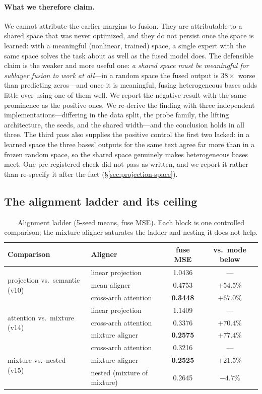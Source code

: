 \documentclass[10pt]{article}
\theoremstyle{definition}
\theoremstyle{plain}
\theoremstyle{remark}
\begin{document}
\paragraph{What we therefore claim.}
We cannot attribute the earlier margins to fusion. They are attributable to a shared space that
was never optimized, and they do not persist once the space is learned: with a meaningful
(nonlinear, trained) space, a single expert with the same space solves the task about as well as
the fused model does. The defensible claim is the weaker and more useful one: \emph{a shared space
must be meaningful for sublayer fusion to work at all}---in a random space the fused output is
$38\times$ worse than predicting zeros---and once it is meaningful, fusing heterogeneous bases
adds little over using one of them well. We report the negative result with the same prominence
as the positive ones. We re-derive the finding with three independent implementations---differing in the data split, the probe family, the lifting architecture, the seeds, and the shared width---and the conclusion holds in all three. The third pass also supplies the positive control the first two lacked: in a learned space the three bases' outputs for the same text agree far more than in a frozen random space, so the shared space genuinely makes heterogeneous bases meet. One pre-registered check did not pass as written, and we report it rather than re-specify it after the fact (\S\ref{sec:projection-space}).

\subsection{The alignment ladder and its ceiling}
\label{sec:align-exp}

\begin{table}[htbp]
\centering
\caption{Alignment ladder (5-seed means, fuse MSE). Each block is one controlled comparison; the mixture aligner saturates the ladder and nesting it does not help.}
\label{tab:ladder}
\begin{tabular}{llcc}
\toprule
\textbf{Comparison} & \textbf{Aligner} & \textbf{fuse MSE} & \textbf{vs.\ mode below} \\
\midrule
\multirow{3}{*}{projection vs.\ semantic (v10)}
 & linear projection & 1.0436 & --- \\
 & mean aligner & 0.4753 & $+54.5\%$ \\
 & cross-arch attention & \textbf{0.3448} & $+67.0\%$ \\
\midrule
\multirow{3}{*}{attention vs.\ mixture (v14)}
 & linear projection & 1.1409 & --- \\
 & cross-arch attention & 0.3376 & $+70.4\%$ \\
 & mixture aligner & \textbf{0.2575} & $+77.4\%$ \\
\midrule
\multirow{3}{*}{mixture vs.\ nested (v15)}
 & cross-arch attention & 0.3216 & --- \\
 & mixture aligner & \textbf{0.2525} & $+21.5\%$ \\
 & nested (mixture of mixture) & 0.2645 & $-4.7\%$ \\
\bottomrule
\end{tabular}
\end{table}
\end{document}
